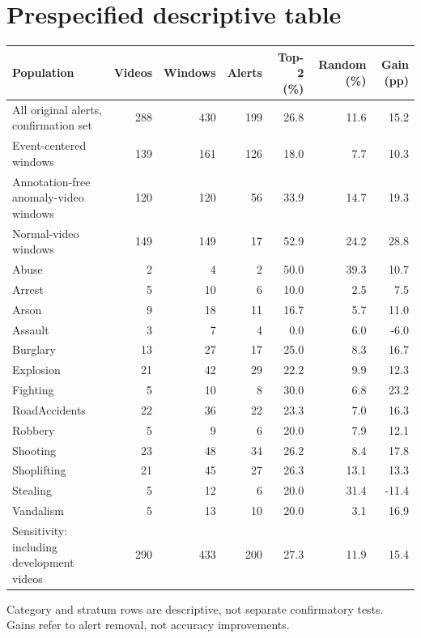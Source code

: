 \documentclass[10pt]{article}
\begin{document}
\section{Prespecified descriptive table}
\small\begin{longtable}{p{5.3cm}rrrrrr}\toprule Population & Videos & Windows & Alerts & Top-2 (\%) & Random (\%) & Gain (pp)\\\midrule\endhead
All original alerts, confirmation set & 288 & 430 & 199 & 26.8 & 11.6 & 15.2 \\
Event-centered windows & 139 & 161 & 126 & 18.0 & 7.7 & 10.3 \\
Annotation-free anomaly-video windows & 120 & 120 & 56 & 33.9 & 14.7 & 19.3 \\
Normal-video windows & 149 & 149 & 17 & 52.9 & 24.2 & 28.8 \\
Abuse & 2 & 4 & 2 & 50.0 & 39.3 & 10.7 \\
Arrest & 5 & 10 & 6 & 10.0 & 2.5 & 7.5 \\
Arson & 9 & 18 & 11 & 16.7 & 5.7 & 11.0 \\
Assault & 3 & 7 & 4 & 0.0 & 6.0 & -6.0 \\
Burglary & 13 & 27 & 17 & 25.0 & 8.3 & 16.7 \\
Explosion & 21 & 42 & 29 & 22.2 & 9.9 & 12.3 \\
Fighting & 5 & 10 & 8 & 30.0 & 6.8 & 23.2 \\
RoadAccidents & 22 & 36 & 22 & 23.3 & 7.0 & 16.3 \\
Robbery & 5 & 9 & 6 & 20.0 & 7.9 & 12.1 \\
Shooting & 23 & 48 & 34 & 26.2 & 8.4 & 17.8 \\
Shoplifting & 21 & 45 & 27 & 26.3 & 13.1 & 13.3 \\
Stealing & 5 & 12 & 6 & 20.0 & 31.4 & -11.4 \\
Vandalism & 5 & 13 & 10 & 20.0 & 3.1 & 16.9 \\
Sensitivity: including development videos & 290 & 433 & 200 & 27.3 & 11.9 & 15.4 \\
\bottomrule\end{longtable}\normalsize
Category and stratum rows are descriptive, not separate confirmatory tests. Gains refer to alert removal, not accuracy improvements.
\end{document}
